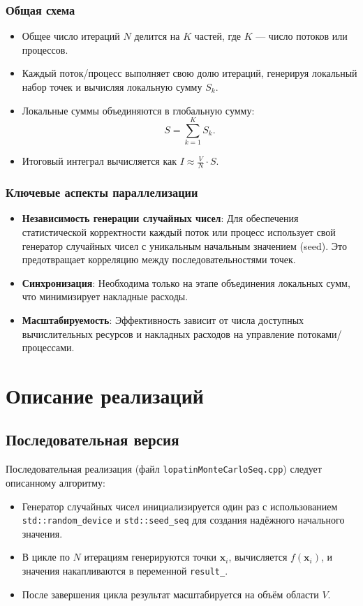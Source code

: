 \documentclass[12pt,a4paper]{extarticle}
\begin{document}
\subsubsection{Общая схема}
\begin{itemize}
    \item Общее число итераций \(N\) делится на \(K\) частей, где \(K\) — число потоков или процессов.
    \item Каждый поток/процесс выполняет свою долю итераций, генерируя локальный набор точек и вычисляя локальную сумму \(S_k\).
    \item Локальные суммы объединяются в глобальную сумму:
    \[
    S = \sum_{k=1}^K S_k.
    \]
    \item Итоговый интеграл вычисляется как \(I \approx \frac{V}{N} \cdot S\).
\end{itemize}

\subsubsection{Ключевые аспекты параллелизации}
\begin{itemize}
    \item \textbf{Независимость генерации случайных чисел}: Для обеспечения статистической корректности каждый поток или процесс использует свой генератор случайных чисел с уникальным начальным значением (seed). Это предотвращает корреляцию между последовательностями точек.
    \item \textbf{Синхронизация}: Необходима только на этапе объединения локальных сумм, что минимизирует накладные расходы.
    \item \textbf{Масштабируемость}: Эффективность зависит от числа доступных вычислительных ресурсов и накладных расходов на управление потоками/процессами.
\end{itemize}

\newpage
\section{Описание реализаций}

\subsection{Последовательная версия}
Последовательная реализация (файл \texttt{lopatinMonteCarloSeq.cpp}) следует описанному алгоритму:
\begin{itemize}
    \item Генератор случайных чисел инициализируется один раз с использованием \texttt{std::random\_device} и \texttt{std::seed\_seq} для создания надёжного начального значения.
    \item В цикле по \(N\) итерациям генерируются точки \(\mathbf{x}_i\), вычисляется \(f(\mathbf{x}_i)\), и значения накапливаются в переменной \texttt{result\_}.
    \item После завершения цикла результат масштабируется на объём области \(V\).
\end{itemize}
\end{document}
